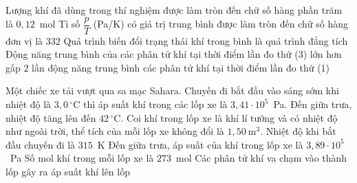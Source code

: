 \begin{ex}
		\choiceTFt
		{Lượng khí đã dùng trong thí nghiệm được làm tròn đến chữ số hàng phần trăm là $0{,}12$~mol}
		{\True Tỉ số $\dfrac{p}{T}$ (Pa/K) có giá trị trung bình được làm tròn đến chữ số hàng đơn vị là $332$}
		{\True Quá trình biến đổi trạng thái khí trong bình là quá trình đẳng tích}
		{Động năng trung bình của các phân tử khí tại thời điểm lần đo thứ (3) lớn hơn gấp $2$ lần động năng trung bình các phân tử khí tại thời điểm lần đo thứ (1)}
	\end{ex}

	\begin{ex}%
		Một chiếc xe tải vượt qua sa mạc Sahara. Chuyến đi bắt đầu vào sáng sớm khi nhiệt độ là $3{,}0\,^\circ\text{C}$ thì áp suất khí trong các lốp xe là $3{,}41\cdot 10^5$~Pa. Đến giữa trưa, nhiệt độ tăng lên đến $42\,^\circ\text{C}$. Coi khí trong lốp xe là khí lí tưởng và có nhiệt độ như ngoài trời, thể tích của mỗi lốp xe không đổi là $1{,}50~\text{m}^3$.
		\choiceTFt
		{Nhiệt độ khi bắt đầu chuyến đi là $315$~K}
		{\True Đến giữa trưa, áp suất của khí trong lốp xe là $3{,}89\cdot 10^5$~Pa}
		{Số mol khí trong mỗi lốp xe là $273$~mol}
		{\True Các phân tử khí va chạm vào thành lốp gây ra áp suất khí lên lốp}
	\end{ex}

